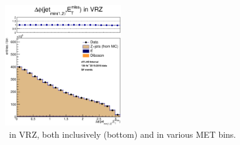 \begin{figure}[htbp]
\includegraphics[width=0.45\textwidth]{Images/SUSY/reweight_Ptll_all_SF_minDPhi2JetsMet_VRZ.eps}
\caption{\mindphijm\ in VRZ, both inclusively (bottom) and in various MET bins.}
\label{fig:VRZ_dPhi2JetMET}
\end{figure}

